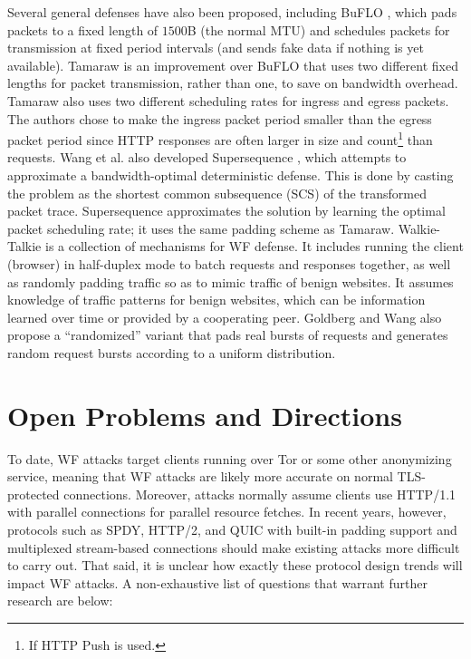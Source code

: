\documentclass[runningheads]{llncs}
\begin{document}
Several general defenses have also been proposed, including BuFLO \cite{dyer2012peek}, which pads packets to
a fixed length of $1500$B (the normal MTU) and schedules packets for transmission at fixed period intervals
(and sends fake data if nothing is yet available). Tamaraw \cite{wang2016website} is an improvement over BuFLO
that uses two different fixed lengths for packet transmission, rather than one, to save on bandwidth overhead.
Tamaraw also uses two different scheduling rates for ingress and egress packets. The authors chose to make
the ingress packet period smaller than the egress packet period since HTTP responses are often larger in size
and count\footnote{If HTTP Push is used.} than requests. Wang et al. also developed Supersequence \cite{wang2016website},
which attempts to approximate a bandwidth-optimal deterministic defense. This is done by casting the problem
as the shortest common subsequence (SCS) of the transformed packet trace. Supersequence approximates
the solution by learning the optimal packet scheduling rate; it uses the same padding scheme as Tamaraw.
Walkie-Talkie \cite{wang2015walkie} is a collection of mechanisms for WF defense. It includes running
the client (browser) in half-duplex mode to batch requests and responses together, as well as randomly
padding traffic so as to mimic traffic of benign websites. It assumes knowledge of traffic patterns for
benign websites, which can be information learned over time or provided by a cooperating peer. Goldberg
and Wang also propose a ``randomized'' variant that pads real bursts of requests and generates random
request bursts according to a uniform distribution.

\section{Open Problems and Directions}
To date, WF attacks target clients running over Tor or some other anonymizing service, meaning that WF
attacks are likely more accurate on normal TLS-protected connections. Moreover, attacks normally assume clients
use HTTP/1.1 with parallel connections for parallel resource fetches. In recent years, however, protocols
such as SPDY, HTTP/2, and QUIC with built-in padding support and multiplexed stream-based connections
should make existing attacks more difficult to carry out. That said, it is unclear how exactly these protocol
design trends will impact WF attacks. A non-exhaustive list of questions that warrant further research
are below:
\end{document}
